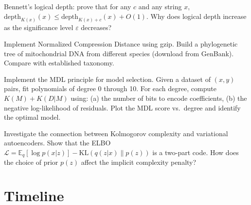 \begin{exercise}[Challenge]
Bennett's logical depth: prove that for any $c$ and any string $x$, $\text{depth}_{K(x)}(x) \le \text{depth}_{K(x)+c}(x) + O(1)$. Why does logical depth increase as the significance level $\varepsilon$ decreases?
\end{exercise}

\begin{exercise}[Computational]
Implement Normalized Compression Distance using gzip. Build a phylogenetic tree of mitochondrial DNA from different species (download from GenBank). Compare with established taxonomy.
\end{exercise}

\begin{exercise}[Computational]
Implement the MDL principle for model selection. Given a dataset of $(x,y)$ pairs, fit polynomials of degree 0 through 10. For each degree, compute $K(M) + K(D|M)$ using: (a) the number of bits to encode coefficients, (b) the negative log-likelihood of residuals. Plot the MDL score vs.\ degree and identify the optimal model.
\end{exercise}

\begin{exercise}[Research]
Investigate the connection between Kolmogorov complexity and variational autoencoders. Show that the ELBO $\mathcal{L} = \mathbb{E}_q[\log p(x|z)] - \text{KL}(q(z|x) \| p(z))$ is a two-part code. How does the choice of prior $p(z)$ affect the implicit complexity penalty?
\end{exercise}

\section{Timeline}
\label{sec:kolmogorov:timeline}

